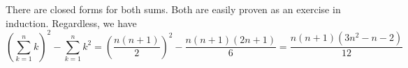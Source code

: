 There are closed forms for both sums.
Both are easily proven as an exercise
in induction. Regardless, we have
$$\left(\sum_{k=1}^n k\right)^2
-\sum_{k=1}^n k^2=
\left(\frac{n(n+1)}{2}\right)^2
-\frac{n(n+1)(2n+1)}{6}
=\frac{n(n+1)(3n^2-n-2)}{12}$$
